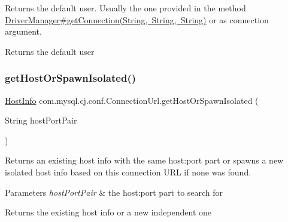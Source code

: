 Returns the default user. Usually the one provided in the method \mbox{\hyperlink{}{Driver\+Manager\#get\+Connection(\+String, String, String)}} or as connection argument.

\begin{DoxyReturn}{Returns}
the default user 
\end{DoxyReturn}
\mbox{\label{classcom_1_1mysql_1_1cj_1_1conf_1_1_connection_url_a45a6498954bd6fad0a39edb05805882a}} 
\subsubsection{\texorpdfstring{get\+Host\+Or\+Spawn\+Isolated()}{getHostOrSpawnIsolated()}\hspace{0.1cm}{\footnotesize\ttfamily [1/2]}}
{\footnotesize\ttfamily \mbox{\hyperlink{classcom_1_1mysql_1_1cj_1_1conf_1_1_host_info}{Host\+Info}} com.\+mysql.\+cj.\+conf.\+Connection\+Url.\+get\+Host\+Or\+Spawn\+Isolated (\begin{DoxyParamCaption}\item[{String}]{host\+Port\+Pair }\end{DoxyParamCaption})}

Returns an existing host info with the same host\+:port part or spawns a new isolated host info based on this connection U\+RL if none was found.


\begin{DoxyParams}{Parameters}
{\em host\+Port\+Pair} & the host\+:port part to search for \\
\hline
\end{DoxyParams}
\begin{DoxyReturn}{Returns}
the existing host info or a new independent one 
\end{DoxyReturn}
\mbox{\label{classcom_1_1mysql_1_1cj_1_1conf_1_1_connection_url_a16fceddeee9baa86584b1f5ab7e55251}} 
